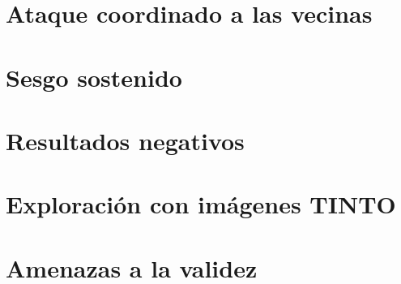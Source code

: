 \section{Ataque coordinado a las vecinas}
\label{sec:res-coordinado}

\section{Sesgo sostenido}
\label{sec:res-sesgo}

\section{Resultados negativos}
\label{sec:res-negativos}

\section{Exploración con imágenes TINTO}
\label{sec:res-tinto}

\section{Amenazas a la validez}
\label{sec:validez}

